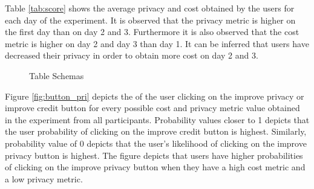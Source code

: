 Table \ref{tab:score} shows the average privacy and cost obtained by the users for each day of the experiment. It is observed that the privacy metric is higher on the first day than on day 2 and 3. Furthermore it is also observed that the cost metric is higher on day 2 and day 3 than day 1.
It can be inferred that users have decreased their privacy in order to obtain more cost on day 2 and 3.

\begin{figure}[htp]
\hspace{1em}
\caption{Table Schemas}
\label{fig:st3}
\end{figure}

Figure \ref{fig:button_pri} depicts the of the user clicking on the improve privacy or improve credit button for every possible cost and privacy metric value obtained in the experiment from all participants. Probability values closer to 1 depicts that the user probability of clicking on the improve credit button is highest. Similarly, probability value of 0 depicts that the user's likelihood of clicking on the improve privacy button is highest. The figure depicts that users have higher probabilities of clicking on the improve privacy button when they have a high cost metric and a low privacy metric.

